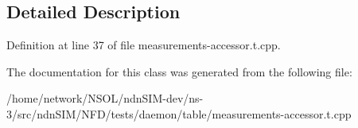 \subsection{Detailed Description}


Definition at line 37 of file measurements-\/accessor.\+t.\+cpp.



The documentation for this class was generated from the following file\+:\begin{DoxyCompactItemize}
\item 
/home/network/\+N\+S\+O\+L/ndn\+S\+I\+M-\/dev/ns-\/3/src/ndn\+S\+I\+M/\+N\+F\+D/tests/daemon/table/measurements-\/accessor.\+t.\+cpp\end{DoxyCompactItemize}

